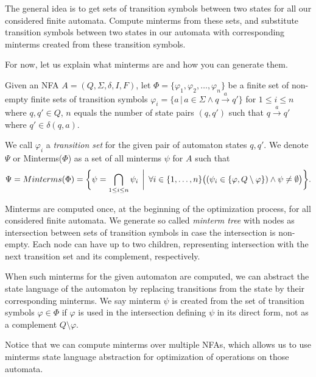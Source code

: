 The general idea is to get sets of transition symbols between two states for all our considered finite automata. Compute minterms from these sets, and substitute transition symbols between two states in our automata with corresponding minterms created from these transition symbols.

For now, let us explain what minterms are and how you can generate them.

\begin{definition} \hfill \newline
Given an NFA $A = (Q, \Sigma, \delta, I, F)$, let $\Phi = \{ \varphi_1, \varphi_2, \ldots, \varphi_n \}$ be a finite set of non-empty finite sets of transition symbols $\varphi_i = \{ a \,\vert\, a \in \Sigma \land q \xrightarrow{a} q' \}$ for $ 1 \leq i \leq n$ where $q, q' \in Q$, $n$ equals the number of state pairs $(q, q')$ such that $q \xrightarrow{a} q'$ where $q' \in \delta(q, a)$.
\end{definition}

We call $\varphi_i$ a \emph{transition  set} for the given pair of automaton states $q, q'$. We denote $\Psi$ or Minterms($\Phi$) as a set of all minterms $\psi$ for $A$ such that
\[
    \Psi = Minterms(\Phi) = \biggl\{ \psi = \bigcap_{1 \leq i \leq n} \psi_i \,\biggm|\,
    \forall i \in \{1, \dots, n\} \bigl( (\psi_i \in \{ \varphi, Q \setminus \varphi \}) \land \psi \neq \emptyset \bigr) \biggr\} \text{.}
\]

Minterms are computed once, at the beginning of the optimization process, for all considered finite automata. We generate so called \emph{minterm tree} with nodes as intersection between sets of transition symbols in case the intersection is non-empty. Each node can have up to two children, representing intersection with the next transition set and its complement, respectively.

When such minterms for the given automaton are computed, we can abstract the state language of the automaton by replacing transitions from the state by their corresponding minterms. We say minterm $\psi$ is created from the set of transition symbols $\varphi \in \Phi$ if $\varphi$ is used in the intersection defining $\psi$ in its direct form, not as a complement $Q \setminus \varphi$.

Notice that we can compute minterms over multiple NFAs, which allows us to use minterms state language abstraction for optimization of operations on those automata.

